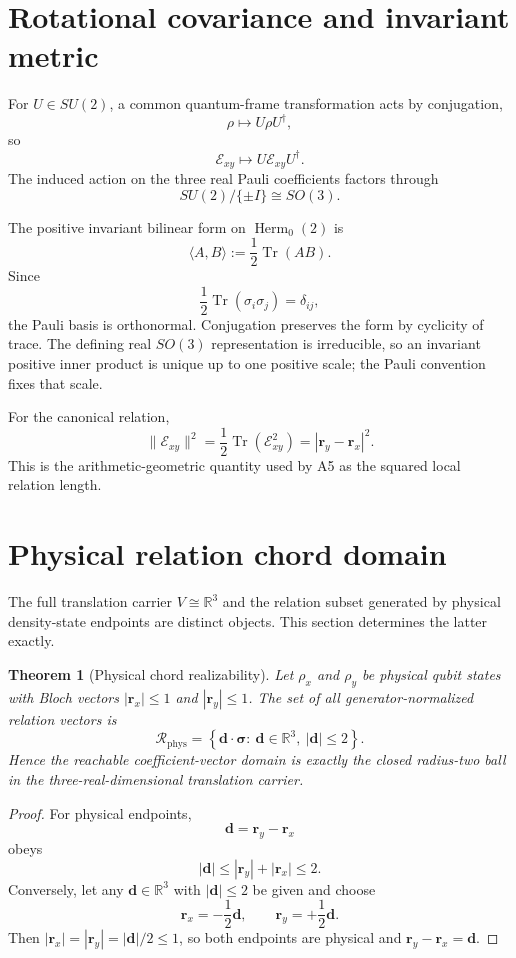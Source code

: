 \documentclass[12pt,a4paper]{article}
\newtheorem{theorem}{Theorem}[section]
\newcommand{\Herm}{\operatorname{Herm}}
\newcommand{\Tr}{\operatorname{Tr}}
\newcommand{\R}{\mathbb{R}}
\newcommand{\Erel}{\mathcal{E}}
\newcommand{\Rphys}{\mathcal{R}_{\mathrm{phys}}}
\newcommand{\sigmavec}{\bm{\sigma}}
\newcommand{\rvec}{\bm{r}}
\newcommand{\dvec}{\bm{d}}
\begin{document}
\section{Rotational covariance and invariant metric}

For $U\in SU(2)$, a common quantum-frame transformation acts by conjugation,
\[
\rho\mapsto U\rho U^\dagger,
\]
so
\[
\boxed{
\Erel_{xy}\mapsto U\Erel_{xy}U^\dagger.
}
\]
The induced action on the three real Pauli coefficients factors through
\[
\boxed{SU(2)/\{\pm I\}\cong SO(3).}
\]

The positive invariant bilinear form on $\Herm_0(2)$ is
\[
\boxed{
\langle A,B\rangle:=\frac12\Tr(AB).
}
\]
Since
\[
\frac12\Tr(\sigma_i\sigma_j)=\delta_{ij},
\]
the Pauli basis is orthonormal. Conjugation preserves the form by cyclicity of trace. The defining real $SO(3)$ representation is irreducible, so an invariant positive inner product is unique up to one positive scale; the Pauli convention fixes that scale.

For the canonical relation,
\[
\boxed{
\|\Erel_{xy}\|^2
=\frac12\Tr(\Erel_{xy}^2)
=|\rvec_y-\rvec_x|^2.
}
\]
This is the arithmetic-geometric quantity used by A5 as the squared local relation length.

\section{Physical relation chord domain}

The full translation carrier $V\cong\R^3$ and the relation subset generated by physical density-state endpoints are distinct objects. This section determines the latter exactly.

\begin{theorem}[Physical chord realizability]\label{thm:chord}
Let $\rho_x$ and $\rho_y$ be physical qubit states with Bloch vectors $|\rvec_x|\le1$ and $|\rvec_y|\le1$. The set of all generator-normalized relation vectors is
\[
\boxed{
\Rphys
=\left\{\dvec\cdot\sigmavec:\ \dvec\in\R^3,\ |\dvec|\le2\right\}.
}
\]
Hence the reachable coefficient-vector domain is exactly the closed radius-two ball in the three-real-dimensional translation carrier.
\end{theorem}

\begin{proof}
For physical endpoints,
\[
\dvec=\rvec_y-\rvec_x
\]
obeys
\[
|\dvec|\le|\rvec_y|+|\rvec_x|\le2.
\]
Conversely, let any $\dvec\in\R^3$ with $|\dvec|\le2$ be given and choose
\[
\rvec_x=-\frac12\dvec,
\qquad
\rvec_y=+\frac12\dvec.
\]
Then $|\rvec_x|=|\rvec_y|=|\dvec|/2\le1$, so both endpoints are physical and $\rvec_y-\rvec_x=\dvec$.
\end{proof}
\end{document}
